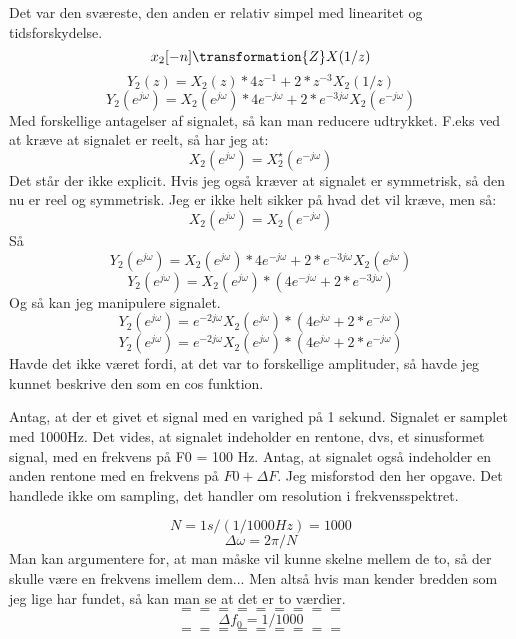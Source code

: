 \begin{rubrik}
\begin{eksamensOpgave}
\begin{UnderOpgave}
            Det var den sværeste, den anden er relativ simpel med linearitet og tidsforskydelse.
            \[x_2[-n] \transformation{Z} X(1/z)\]
            \[Y_2(z) = X_2(z) * 4 z^{-1} + 2 * z^{-3}X_2(1/z)\]
            \[Y_2(e^{j\omega}) = X_2(e^{j\omega}) * 4 e^{-j\omega} + 2 * e^{-3 j\omega}X_2(e^{-j\omega})\]
            Med forskellige antagelser af signalet, så kan man reducere udtrykket.
            F.eks ved at kræve at signalet er reelt, så har jeg at: 
            \[X_2(e^{j\omega}) = X_2^\star(e^{-j\omega})\]
            Det står der ikke explicit. 
            Hvis jeg også kræver at signalet er symmetrisk, så den nu er reel og symmetrisk. Jeg er ikke helt sikker på hvad det vil kræve, men så: 
            \[X_2(e^{j\omega}) = X_2(e^{-j\omega})\]
            Så
            \[Y_2(e^{j\omega}) = X_2(e^{j\omega}) * 4 e^{-j\omega} + 2 * e^{-3 j\omega}X_2(e^{j\omega})\]
            \[Y_2(e^{j\omega}) = X_2(e^{j\omega}) *( 4 e^{-j\omega} + 2 * e^{-3 j\omega})\]
            Og så kan jeg manipulere signalet.
            \[Y_2(e^{j\omega}) = e^{-2j\omega} X_2(e^{j\omega}) * ( 4 e^{j\omega} + 2 * e^{- j\omega})\]
            \[Y_2(e^{j\omega}) = e^{-2j\omega} X_2(e^{j\omega}) * ( 4 e^{j\omega} + 2 * e^{- j\omega})\]
            Havde det ikke været fordi, at det var to forskellige amplituder, så havde jeg kunnet beskrive den som en cos funktion. 
        \end{UnderOpgave}
    \end{eksamensOpgave}
    \begin{eksamensOpgave}
        Antag, at der et givet et signal med en varighed på 1 sekund. Signalet er samplet med 1000Hz. Det vides, at signalet indeholder en rentone, dvs, et sinusformet signal, med en frekvens
        på F0 = 100 Hz. Antag, at signalet også indeholder en anden rentone med en frekvens på $F0 + \Delta F$.
        Jeg misforstod den her opgave. Det handlede ikke om sampling, det handler om resolution i frekvensspektret.
        \begin{UnderOpgave}
            \[N = 1s/(1/1000Hz) = 1000\]
            \[\Delta \omega = 2\pi/N\]
            Man kan argumentere for, at man måske vil kunne skelne mellem de to, så der skulle være en frekvens imellem dem...
            Men altså hvis man kender bredden som jeg lige har fundet, så kan man se at det er to værdier. 
            \[=========\]
            \[\Delta f_0 = 1/1000\]
            \[=========\]
        \end{UnderOpgave}

\end{eksamensOpgave}
\end{rubrik}
